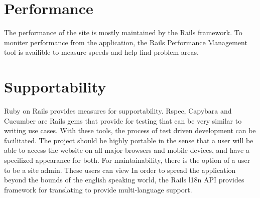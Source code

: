 \section{Performance}
The performance of the site is mostly maintained by the Rails framework. To moniter performance from the application, the Rails Performance Management tool is availible to measure speeds and help find problem areas.


\section{Supportability}
Ruby on Rails provides measures for supportability. Rspec, Capybara and Cucumber are Rails gems that provide for testing that can be very similar to writing use cases. With these tools, the process of test driven development can be facilitated. 
The project should be highly portable in the sense that a user will be able to access the website on all major browsers and mobile devices, and have a specilized appearance for both. 
For maintainability, there is the option of a user to be a site admin. These users can view 
In order to spread the application beyond the bounds of the english speaking world, the Rails l18n API provides framework for translating to provide multi-language support.
